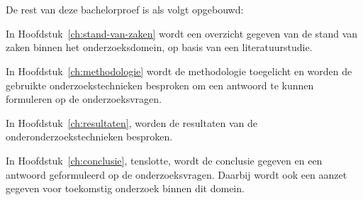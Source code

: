 \section{}%
\label{sec:opzet-bachelorproef}


De rest van deze bachelorproef is als volgt opgebouwd:

In Hoofdstuk~\ref{ch:stand-van-zaken} wordt een overzicht gegeven van de stand van zaken binnen het onderzoeksdomein, op basis van een literatuurstudie.

In Hoofdstuk~\ref{ch:methodologie} wordt de methodologie toegelicht en worden de gebruikte onderzoekstechnieken besproken om een antwoord te kunnen formuleren op de onderzoeksvragen.

In Hoofdstuk~\ref{ch:resultaten}, worden de resultaten van de onderonderzoekstechnieken besproken.

In Hoofdstuk~\ref{ch:conclusie}, tenslotte, wordt de conclusie gegeven en een antwoord geformuleerd op de onderzoeksvragen. Daarbij wordt ook een aanzet gegeven voor toekomstig onderzoek binnen dit domein.